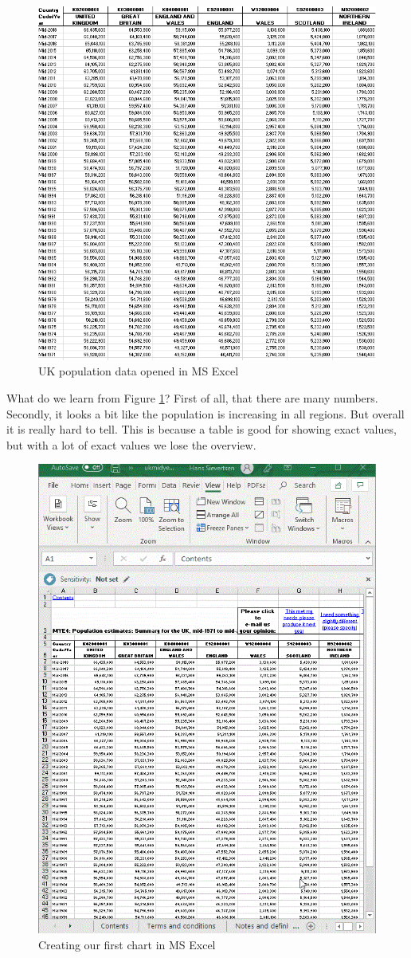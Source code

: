 \documentclass[]{book}
\begin{document}
\begin{figure}

{\centering \includegraphics[width=0.6\linewidth]{_resources/chapter_people/table} 

}

\caption{UK population data opened in MS Excel}\label{fig:popdata}
\end{figure}

What do we learn from Figure \ref{fig:popdata}? First of all, that there are many numbers. Secondly, it looks a bit like the population is increasing in all regions. But overall it is really hard to tell. This is because a table is good for showing exact values, but with a lot of exact values we lose the overview.

\begin{figure}

{\centering \includegraphics[width=0.6\linewidth]{_resources/chapter_people/visualisingdata1} 

}

\caption{Creating our first chart in MS Excel}\label{fig:firstchart}
\end{figure}
\end{document}

